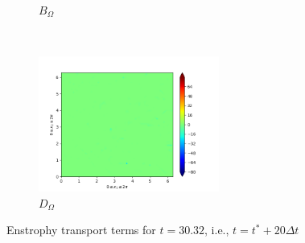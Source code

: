 \begin{figure}[H]
\begin{subfigure}{0.45\textwidth}
        \caption{$B_{\Omega}$}
    \end{subfigure}
    ~
    \begin{subfigure}{0.45\textwidth}
        \includegraphics[height=1.75in]{media/run-cds-65/D-enst-1360.png}
        \caption{$D_{\Omega}$}
    \end{subfigure}
    \caption{Enstrophy transport terms for $t=30.32$, i.e., $t=t^{\ast} + 20 \Delta t$}
\end{figure}

\newpage

